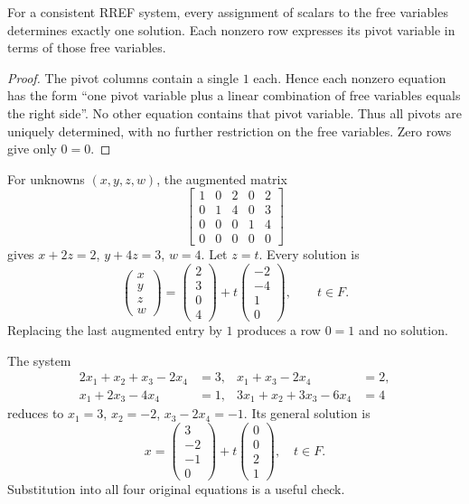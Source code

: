 \begin{theorem}
For a consistent RREF system, every assignment of scalars to the free
variables determines exactly one solution. Each nonzero row expresses its
pivot variable in terms of those free variables.
\end{theorem}
\begin{proof}
The pivot columns contain a single $1$ each. Hence each nonzero equation
has the form ``one pivot variable plus a linear combination of free variables
equals the right side''. No other equation contains that pivot variable.
Thus all pivots are uniquely determined, with no further restriction on the
free variables. Zero rows give only $0=0$.
\end{proof}

\begin{example}
For unknowns $(x,y,z,w)$, the augmented matrix
\[
\left[\begin{array}{cccc|c}
1&0&2&0&2\\0&1&4&0&3\\0&0&0&1&4\\0&0&0&0&0
\end{array}\right]
\]
gives $x+2z=2$, $y+4z=3$, $w=4$. Let $z=t$. Every solution is
\[
\begin{pmatrix}x\\y\\z\\w\end{pmatrix}
=\begin{pmatrix}2\\3\\0\\4\end{pmatrix}
+t\begin{pmatrix}-2\\-4\\1\\0\end{pmatrix},\qquad t\in F.
\]
Replacing the last augmented entry by $1$ produces a row $0=1$ and no solution.
\end{example}

\begin{example}
The system
\begin{align*}
2x_1+x_2+x_3-2x_4&=3,&x_1+x_3-2x_4&=2,\\
x_1+2x_3-4x_4&=1,&3x_1+x_2+3x_3-6x_4&=4
\end{align*}
reduces to $x_1=3$, $x_2=-2$, $x_3-2x_4=-1$. Its general solution is
\[
x=\begin{pmatrix}3\\-2\\-1\\0\end{pmatrix}
+t\begin{pmatrix}0\\0\\2\\1\end{pmatrix},\quad t\in F.
\]
Substitution into all four original equations is a useful check.
\end{example}

